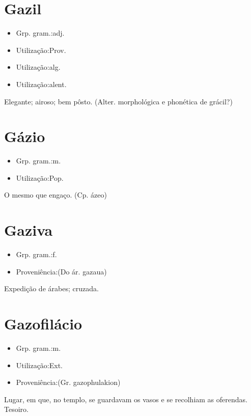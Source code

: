 \section{Gazil}
\begin{itemize}
\item {Grp. gram.:adj.}
\end{itemize}
\begin{itemize}
\item {Utilização:Prov.}
\end{itemize}
\begin{itemize}
\item {Utilização:alg.}
\end{itemize}
\begin{itemize}
\item {Utilização:alent.}
\end{itemize}
Elegante; airoso; bem pôsto.
(Alter. morphológica e phonética de \textunderscore grácil\textunderscore ?)
\section{Gázio}
\begin{itemize}
\item {Grp. gram.:m.}
\end{itemize}
\begin{itemize}
\item {Utilização:Pop.}
\end{itemize}
O mesmo que \textunderscore engaço\textunderscore .
(Cp. \textunderscore ázeo\textunderscore )
\section{Gaziva}
\begin{itemize}
\item {Grp. gram.:f.}
\end{itemize}
\begin{itemize}
\item {Proveniência:(Do ár. \textunderscore gazaua\textunderscore )}
\end{itemize}
Expedição de árabes; cruzada.
\section{Gazofilácio}
\begin{itemize}
\item {Grp. gram.:m.}
\end{itemize}
\begin{itemize}
\item {Utilização:Ext.}
\end{itemize}
\begin{itemize}
\item {Proveniência:(Gr. \textunderscore gazophulakion\textunderscore )}
\end{itemize}
Lugar, em que, no templo, se guardavam os vasos e se recolhiam as oferendas.
Tesoiro.
